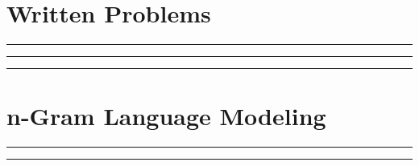 \documentclass{article}
\begin{document}


\section*{Written Problems}
\noindent\rule{\textwidth}{1pt}\vspace{0.75mm}



\noindent\rule{\textwidth}{1pt}\vspace{0.75mm}



\noindent\rule{\textwidth}{1pt}\vspace{0.75mm}



\vspace{1.0mm}
\section*{n-Gram Language Modeling}
\noindent\rule{\textwidth}{1pt}\vspace{0.75mm}


\noindent\rule{\textwidth}{1pt}\vspace{0.75mm}

\end{document}
